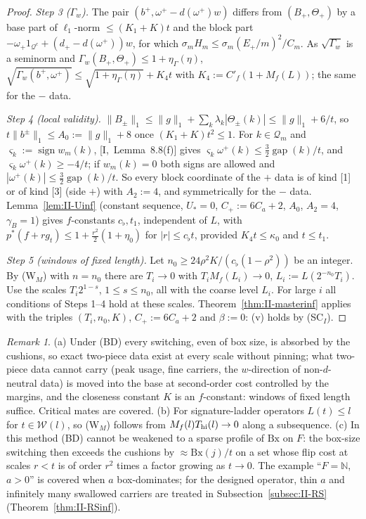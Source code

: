 \documentclass[10pt]{amsart}
\theoremstyle{definition}
\theoremstyle{remark}
\newtheorem{remark}[theorem]{Remark}
\newcommand{\sgn}{\operatorname{sign}}
\newcommand{\N}{\mathbb N}
\newcommand{\gap}{\operatorname{gap}}
\begin{document}
\begin{proof}
\emph{Step 3 ($\Gamma_w$).}  The pair $(b^+,\omega^+-d(\omega^+)w)$ differs from
$(B_+,\Theta_+)$ by a base part of $\ell_1$-norm $\le(K_1+K)t$ and the block
part $-\omega_+1_{\mathcal Q^c}+(d_+-d(\omega^+))w$, for which
$\sigma_mH_m\le\sigma_m(E_+/m)^2/C_m$.  As $\sqrt{\Gamma_w}$ is a seminorm and
$\Gamma_w(B_+,\Theta_+)\le1+\eta_\Gamma(\eta)$, $\sqrt{\Gamma_w(b^+,
\omega^+)}\le\sqrt{1+\eta_\Gamma(\eta)}+K_4t$ with $K_4:=C'_f(1+M_f(L))$; the
same for the $-$ data.

\emph{Step 4 (local validity).}  $\|B_\pm\|_1\le\|g\|_1+\sum_k\lambda_k
|\Theta_\pm(k)|\le\|g\|_1+6/t$, so $t\|b^\pm\|_1\le A_0:=\|g\|_1+8$ once
$(K_1+K)t^2\le1$.  For $k\in\mathcal Q_m$ and $\varsigma_k:=\sgn w_m(k)$,
[I,~Lemma~8.8(f)] gives $\varsigma_k\omega^+(k)\le\frac32\gap(k)/t$, and
$\varsigma_k\omega^+(k)\ge-4/t$; if $w_m(k)=0$ both signs are allowed and
$|\omega^+(k)|\le\frac32\gap(k)/t$.  So every block coordinate of the $+$ data
is of kind [1] or of kind [3] (side $+$) with $A_2:=4$, and symmetrically for
the $-$ data.  Lemma~\ref{lem:II-Uinf} (constant sequence, $U_*=0$,
$C_+:=6C_a+2$, $A_0$, $A_2=4$, $\gamma_B=1$) gives $f$-constants
$c_\flat,t_1$, independent of $L$, with $p^*(f+rg_t)\le1+\frac{r^2}2
(1+\eta_0)$ for $|r|\le c_\flat t$, provided $K_4t\le\kappa_0$ and $t\le t_1$.

\emph{Step 5 (windows of fixed length).}  Let $n_0\ge24\rho^2K/(c_\flat
(1-\rho^2))$ be an integer.  By (W$_M$) with $n=n_0$ there are $T_i\to0$ with
$T_iM_f(L_i)\to0$, $L_i:=L(2^{-n_0}T_i)$.  Use the scales
$T_i2^{1-s}$, $1\le s\le n_0$, all with the coarse level $L_i$.  For large
$i$ all conditions of Steps 1--4 hold at these scales.
Theorem~\ref{thm:II-masterinf} applies with the triples $(T_i,n_0,K)$,
$C_+:=6C_a+2$ and $\beta:=0$: (v) holds by (SC$_I$).
\end{proof}

\begin{remark}\label{rem:II-N}
(a) Under (BD) every switching, even of box size, is absorbed by the
cushions, so exact two-piece data exist at every scale without pinning;
what two-piece data cannot carry (peak usage, fine carriers, the
$w$-direction of non-$d$-neutral data) is moved into the base at second-order
cost controlled by the margins, and the closeness constant $K$ is an
$f$-constant: windows of fixed length suffice.  Critical mates are covered.
(b) For signature-ladder operators $L(t)\le l$ for $t\in\mathcal W(l)$, so
(W$_M$) follows from $M_f(l)T_{\rm hi}(l)\to0$ along a subsequence.
(c) In this method (BD) cannot be weakened to a sparse profile of
$\mathrm{Bx}$ on $F$: the box-size switching then exceeds the cushions by
$\approx\mathrm{Bx}(j)/t$ on a set whose flip cost at scales $r<t$ is of order
$r^2$ times a factor growing as $t\to0$.  The example ``$F=\N$, $a>0$'' is
covered when $a$ box-dominates; for the designed operator, thin $a$ and
infinitely many swallowed carriers are treated in
Subsection~\ref{subsec:II-RS} (Theorem~\ref{thm:II-RSinf}).
\end{remark}
\end{document}
